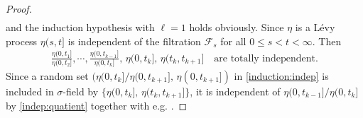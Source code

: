 \documentclass[11pt,leqno%
]{amsart}
\newcommand{\1}{{\mathbf 1}}
\begin{document}
\begin{proof}
\begin{align*}
\end{align*}
and the induction hypothesis with $\ell=1$ holds obviously. 
Since $\eta$ is a L\'evy process $\eta(s,t]$ is independent of the
 filtration $\mathcal F_s$ for all $0\le s<t<\infty$. 
Then 
\begin{align}
\label{indep:quatient}
 \frac{\eta(0,t_1]}{\eta(0,t_2]}, \cdots,
 \frac{\eta(0,t_{k-1}]}{\eta(0,t_k]},\, \eta(0,t_k],\,\eta(t_{k},t_{k+1}]\quad \text{are totally independent}.
\end{align}
Since a random set $(\eta(0,t_k]/\eta(0,t_{k+1}],\,\eta(0,t_{k+1}])$ in
 \eqref{induction:indep} is
 included in $\sigma$-field by $\{\eta(0,t_k],\,\eta(t_k,t_{k+1}]\}$, it 
is independent of $\eta(0,t_{k-1}]/\eta(0,t_k]$ by
 \eqref{indep:quatient} together with e.g. %
 \cite[Theorem 3.3.2]{chung:2000}. 

\end{proof}
\end{document}
